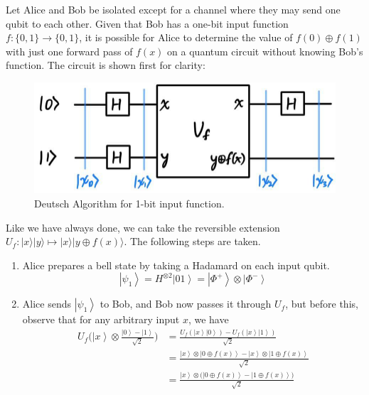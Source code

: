 \documentclass{article}
\newcommand{\ket}[1]{\ensuremath{\left|#1\right\rangle}}
\begin{document}
    \begin{theorem}  
      Let Alice and Bob be isolated except for a channel where they may send one qubit to each other. Given that Bob has a one-bit input function $f: \{0, 1\} \longrightarrow \{0, 1\}$, it is possible for Alice to determine the value of $f(0) \oplus f(1)$ with just one forward pass of $f(x)$ on a quantum circuit without knowing Bob's function. The circuit is shown first for clarity: 
      \begin{figure}[H]
        \centering 
          \includegraphics[scale=0.3]{img/Deutsch_Algo.jpg}
        \caption{Deutsch Algorithm for 1-bit input function.} 
        \label{fig:Deutsch_Algo}
      \end{figure}
      Like we have always done, we can take the reversible extension $U_f: |x\rangle |y\rangle \mapsto |x \rangle |y \oplus f(x)\rangle$. The following steps are taken. 
      \begin{enumerate} 
        \item Alice prepares a bell state by taking a Hadamard on each input qubit. 
          \begin{equation} 
            \ket{\psi_1} = H^{\otimes 2} \ket{01} = \ket{\Phi^+} \otimes \ket{\Phi^-} 
          \end{equation}
        \item Alice sends $\ket{\psi_1}$ to Bob, and Bob now passes it through $U_f$, but before this, observe that for any arbitrary input $x$, we have  
          \begin{align} 
            U_f \bigg( \ket{x} \otimes \frac{\ket{0} - \ket{1}}{\sqrt{2}} \bigg) 
            & = \frac{U_f (\ket{x} \ket{0}) - U_f (\ket{x} \ket{1})}{\sqrt{2}} \\
            & =  \frac{\ket{x} \otimes \ket{0 \oplus f(x)} - \ket{x} \otimes \ket{1 \oplus f(x)}}{\sqrt{2}} \\ 
            & = \frac{\ket{x} \otimes \big( \ket{0 \oplus f(x)} - \ket{1 \oplus f(x)} \big)}{\sqrt{2}} \\ 

\end{align}
\end{enumerate}
\end{theorem}
\end{document}
